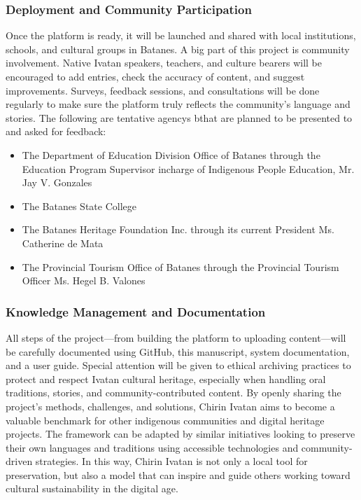             \subsubsection{Deployment and Community Participation}
            Once the platform is ready, it will be launched and shared with local institutions, schools, and cultural groups in Batanes. A big part of this project is community involvement. Native Ivatan speakers, teachers, and culture bearers will be encouraged to add entries, check the accuracy of content, and suggest improvements. Surveys, feedback sessions, and consultations will be done regularly to make sure the platform truly reflects the community’s language and stories. The following are tentative agencys bthat are planned to be presented to and asked for feedback:
                \begin{itemize}
                \item The Department of Education Division Office of Batanes through the Education Program Supervisor incharge of Indigenous People Education, Mr. Jay V. Gonzales
                \item The Batanes State College
                \item The Batanes Heritage Foundation Inc. through its current President Ms. Catherine de Mata
                \item The Provincial Tourism Office of Batanes through the Provincial Tourism Officer Ms. Hegel B. Valones
            \end{itemize}
            \subsubsection{Knowledge Management and Documentation}
            All steps of the project—from building the platform to uploading content—will be carefully documented using GitHub, this manuscript, system documentation, and a user guide. Special attention will be given to ethical archiving practices to protect and respect Ivatan cultural heritage, especially when handling oral traditions, stories, and community-contributed content.
            By openly sharing the project’s methods, challenges, and solutions, Chirin Ivatan aims to become a valuable benchmark for other indigenous communities and digital heritage projects. The framework can be adapted by similar initiatives looking to preserve their own languages and traditions using accessible technologies and community-driven strategies. In this way, Chirin Ivatan is not only a local tool for preservation, but also a model that can inspire and guide others working toward cultural sustainability in the digital age.
